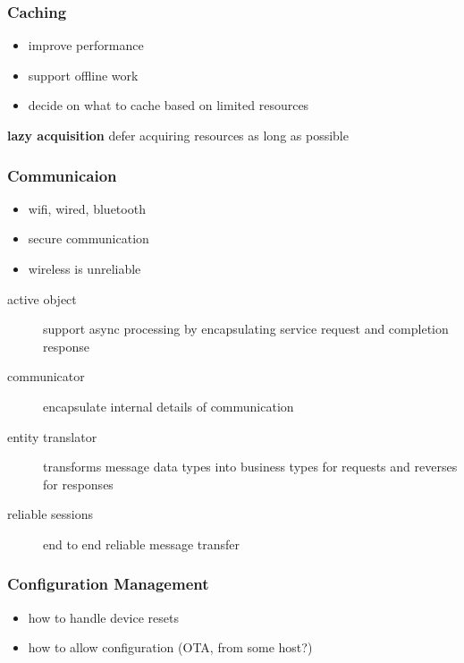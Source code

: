 \documentclass[]{article}
\theoremstyle{definition}
\begin{document}
	\subsubsection{Caching}
	\begin{itemize}
		\item improve performance
		\item support offline work
		\item decide on what to cache based on limited resources
	\end{itemize}
	\textbf{lazy acquisition} defer acquiring resources as long as possible

	\subsubsection{Communicaion}
	\begin{itemize}
		\item wifi, wired, bluetooth
		\item secure communication
		\item wireless is unreliable
	\end{itemize}
	\begin{description}
		\item[active object] support async processing by encapsulating service request and completion response
		\item[communicator] encapsulate internal details of communication 
		\item[entity translator] transforms message data types into business types for requests and reverses for responses
		\item[reliable sessions] end to end reliable message transfer
	\end{description}

	\subsubsection{Configuration Management}
	\begin{itemize}
		\item how to handle device resets
		\item how to allow configuration (OTA, from some host?)
	\end{itemize}
\end{document}
